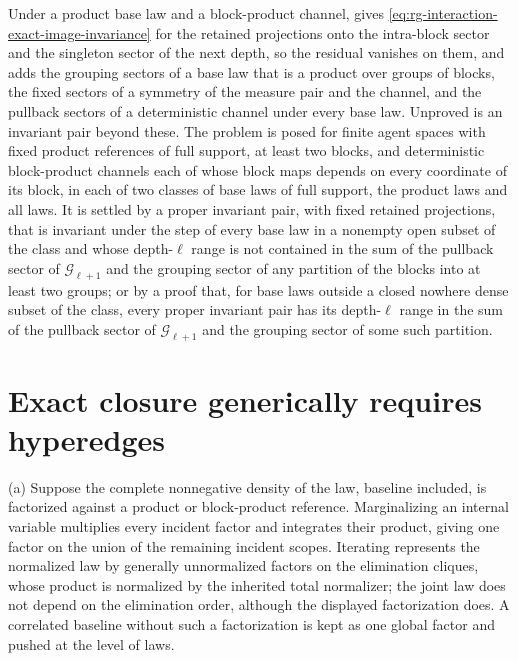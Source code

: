 Under a product base law and a block-product channel,
 gives
\eqref{eq:rg-interaction-exact-image-invariance} for the retained projections onto
the intra-block sector and the singleton sector of the next depth, so the residual
vanishes on them, and  adds the grouping
sectors of a base law that is a product over groups of blocks, the fixed sectors of
a symmetry of the measure pair and the channel, and the pullback sectors of a
deterministic channel under every base law. Unproved is an invariant pair beyond
these. The problem is posed for finite agent spaces with fixed product references
of full support, at least two blocks, and deterministic block-product channels each
of whose block maps depends on every coordinate of its block, in each of two classes
of base laws of full support, the product laws and all laws. It is settled by a
proper invariant pair, with fixed retained projections, that is invariant under the
step of every base law in a nonempty open subset of the class and whose depth-$\ell$
range is not contained in the sum of the pullback sector of $\mathcal G_{\ell+1}$
and the grouping sector of any partition of the blocks into at least two groups; or
by a proof that, for base laws outside a closed nowhere dense subset of the class,
every proper invariant pair has its depth-$\ell$ range in the sum of the pullback
sector of $\mathcal G_{\ell+1}$ and the grouping sector of some such partition.

\section{Exact closure generically requires hyperedges}
\label{sec:rg-hypergraph-closure}

(a) Suppose the complete nonnegative density of the law, baseline included, is
factorized against a product or block-product reference. Marginalizing an internal
variable multiplies every incident factor and integrates their product, giving one
factor on the union of the remaining incident scopes. Iterating represents the
normalized law by generally unnormalized factors on the elimination cliques, whose
product is normalized by the inherited total normalizer; the joint law does not
depend on the elimination order, although the displayed factorization does. A
correlated baseline without such a factorization is kept as one global factor and
pushed at the level of laws.

